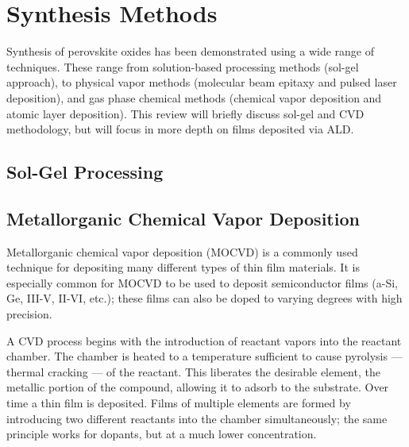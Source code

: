 \chapter{Synthesis Methods}
\label{chap:Synth}
\thispagestyle{empty}


Synthesis of perovskite oxides has been demonstrated using a wide range of techniques. These range from solution-based processing methods (sol-gel approach), to physical vapor methods (molecular beam epitaxy and pulsed laser deposition), and gas phase chemical methods (chemical vapor deposition and atomic layer deposition). This review will briefly discuss sol-gel and CVD methodology, but will focus in more depth on films deposited via ALD. 


\section{Sol-Gel Processing}
\label{sec:Synth-SolGel}

\lipsum



\section{Metallorganic Chemical Vapor Deposition}
\label{sec:Synth-MOCVD}

Metallorganic chemical vapor deposition (MOCVD) is a commonly used technique for depositing many different types of thin film materials. It is especially common for MOCVD to be used to deposit semiconductor films (a-Si, Ge, III-V, II-VI, etc.); these films can also be doped to varying degrees with high precision. 

A CVD process begins with the introduction of reactant vapors into the reactant chamber. The chamber is heated to a temperature sufficient to cause pyrolysis --- thermal cracking --- of the reactant. This liberates the desirable element, the metallic portion of the compound, allowing it to adsorb to the substrate. Over time a thin film is deposited. Films of multiple elements are formed by introducing two different reactants into the chamber simultaneously; the same principle works for dopants, but at a much lower concentration. 

